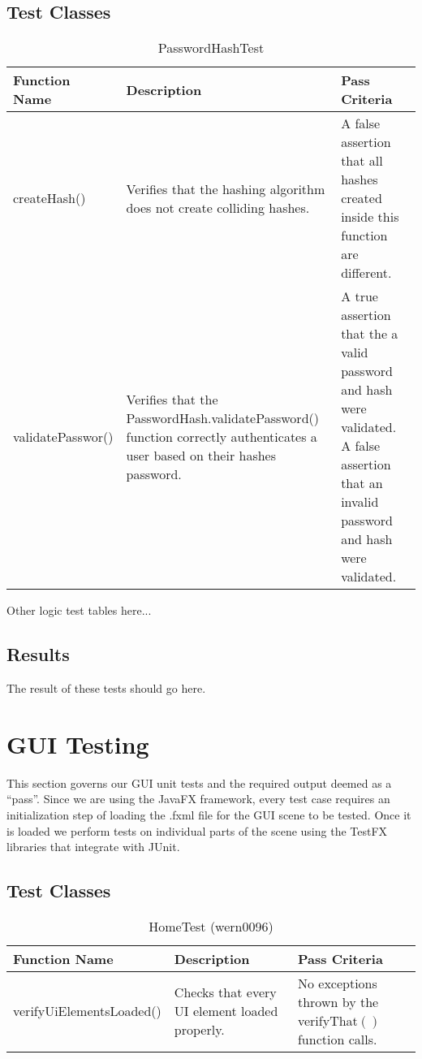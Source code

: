 \documentclass[14pt, a4paper]{article}
\begin{document}
\subsection{Test Classes}

\begin{table}[h]
	\centering	
	\caption{PasswordHashTest}
	\begin{tabular}{|p{3cm}|p{6cm}|p{6cm}|} 
		\hline
		\textbf{Function Name} & \textbf{Description} & \textbf{Pass Criteria}  \\\hline
		createHash() & Verifies that the hashing algorithm does not create colliding hashes. & A false assertion that all hashes created inside this function are different. \\\hline
		validatePasswor() & Verifies that the PasswordHash.validatePassword() function correctly authenticates a user based on their hashes password. & A true assertion that the a valid password and hash were validated. A false assertion that an invalid password and hash were validated.  \\\hline
	\end{tabular}
\end{table}

Other logic test tables here...

\newpage

\subsection{Results}

The result of these tests should go here.

\newpage

\section{GUI Testing}

This section governs our GUI unit tests and the required output deemed as a ``pass''. Since we are using the JavaFX framework, every test case requires an initialization step of loading the .fxml file for the GUI scene to be tested. Once it is loaded we perform tests on individual parts of the scene using the TestFX libraries that integrate with JUnit.

\subsection{Test Classes}

\begin{table}[h]
	\centering	
	\caption{HomeTest (wern0096)}
	\begin{tabular}{|p{4cm}|p{5cm}|p{6cm}|} 
		\hline
		\textbf{Function Name} & \textbf{Description} & \textbf{Pass Criteria}  \\\hline
		verifyUiElementsLoaded() & Checks that every UI element loaded properly. & No exceptions thrown by the verifyThat$\left(\right)$ function calls. \\\hline
	\end{tabular}
\end{table}
\end{document}
